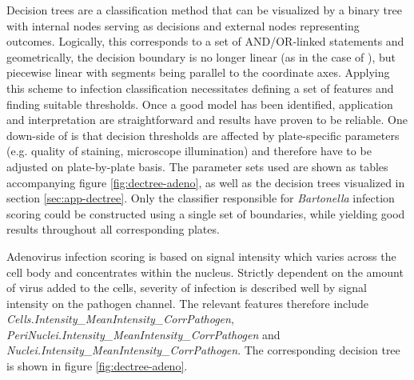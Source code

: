 Decision trees are a classification method that can be visualized by a binary tree with internal nodes serving as decisions and external nodes representing outcomes. Logically, this corresponds to a set of AND\slash OR-linked statements and geometrically, the decision boundary is no longer linear (as in the case of ), but piecewise linear with segments being parallel to the coordinate axes. Applying this scheme to infection classification necessitates defining a set of features and finding suitable thresholds. Once a good model has been identified, application and interpretation are straightforward and results have proven to be reliable. One down-side of  is that decision thresholds are affected by plate-specific parameters (e.g. quality of staining, microscope illumination) and therefore have to be adjusted on plate-by-plate basis. The parameter sets used are shown as tables accompanying figure \ref{fig:dectree-adeno}, as well as the decision trees visualized in section \ref{sec:app-dectree}. Only the classifier responsible for \textit{Bartonella} infection scoring could be constructed using a single set of boundaries, while yielding good results throughout all corresponding plates. 

Adenovirus infection scoring is based on  signal intensity which varies across the cell body and concentrates within the nucleus. Strictly dependent on the amount of virus added to the cells, severity of infection is described well by signal intensity on the pathogen channel. The relevant features therefore include \textit{Cells.Intensity\_MeanIntensity\_CorrPathogen}, \textit{PeriNuclei.Intensity\_MeanIn\-tensity\_CorrPathogen} and \textit{Nuclei.Intensity\_MeanIntensity\_CorrPathogen}. The corresponding decision tree is shown in figure \ref{fig:dectree-adeno}.

